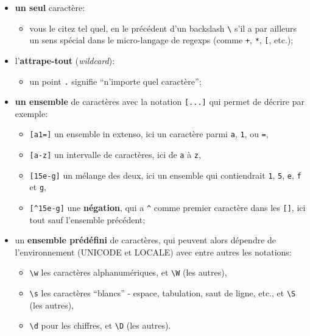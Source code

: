 \begin{itemize}
	\item 
	\textbf{un seul} caractère:
	\begin{itemize}
		\item 
		vous le citez tel quel, en le précédent d'un backslash
		\texttt{\textbackslash{}} s'il a par ailleurs un sens spécial dans le
		micro-langage de regexps (comme \texttt{+}, \texttt{*}, \texttt{{[}},
		etc.);
	\end{itemize}
	\item
	l'\textbf{attrape-tout} (\emph{wildcard}):
	\begin{itemize}
		\item 
		un point \texttt{.} signifie ``n'importe quel caractère'';
	\end{itemize}
	\item
	\textbf{un ensemble} de caractères avec la notation \texttt{{[}...{]}} qui permet de décrire par exemple:
	\begin{itemize}
		\item 
		\texttt{{[}a1={]}} un ensemble in extenso, ici un
		caractère parmi \texttt{a}, \texttt{1}, ou \texttt{=},
		\item
		\texttt{{[}a-z{]}} un intervalle de caractères, ici de \texttt{a} à
		\texttt{z},
		\item
		\texttt{{[}15e-g{]}} un mélange des deux, ici un ensemble
		qui contiendrait \texttt{1}, \texttt{5}, \texttt{e}, \texttt{f} et
		\texttt{g},
		\item
		\texttt{{[}\^{}15e-g{]}} une \textbf{négation}, qui a
		\texttt{\^{}} comme premier caractère dans les \texttt{{[}{]}}, ici tout
		sauf l'ensemble précédent;
	\end{itemize}
	\item
	un \textbf{ensemble prédéfini} de caractères, qui peuvent alors dépendre de l'environnement (UNICODE et LOCALE) avec entre autres les notations:
	\begin{itemize}
		\item 
		 \texttt{\textbackslash{}w}
		les caractères alphanumériques, et \texttt{\textbackslash{}W} (les
		autres),
		\item
		\texttt{\textbackslash{}s} les caractères ``blancs'' -
		espace, tabulation, saut de ligne, etc., et \texttt{\textbackslash{}S}
		(les autres),
		\item
		\texttt{\textbackslash{}d} pour les chiffres, et
		\texttt{\textbackslash{}D} (les autres).
    \end{itemize}
\end{itemize}

